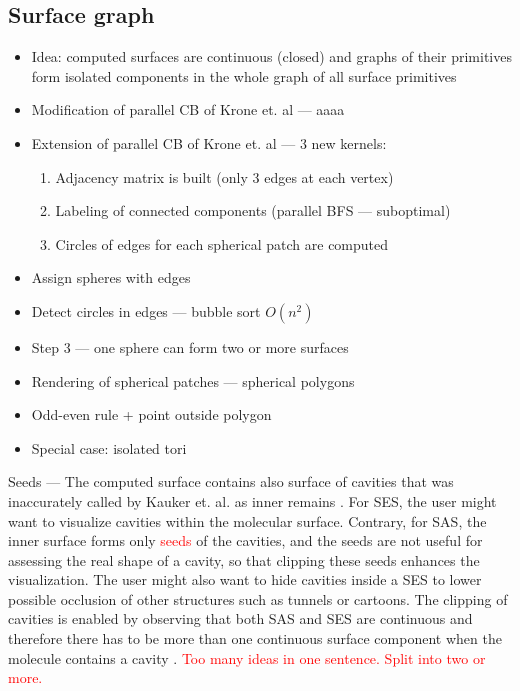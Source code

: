 \subsection{Surface graph}
\begin{itemize}
  \item Idea: computed surfaces are continuous (closed) and graphs of their primitives form isolated components in the whole graph of all surface primitives
  \item Modification of parallel CB of Krone et. al --- aaaa
  \item Extension of parallel CB of Krone et. al --- 3 new kernels:
	\begin{enumerate}
	  \item Adjacency matrix is built (only 3 edges at each vertex)
    \item Labeling of connected components (parallel BFS --- suboptimal)
    \item Circles of edges for each spherical patch are computed
  \end{enumerate}
  \item Assign spheres with edges
  \item Detect circles in edges --- bubble sort $O(n^2)$
  \item Step 3 --- one sphere can form two or more surfaces
  \item Rendering of spherical patches --- spherical polygons
  \item Odd-even rule + point outside polygon
  \item Special case: isolated tori
\end{itemize}

Seeds --- The computed surface contains also surface of cavities that was inaccurately called by Kauker et. al. as inner remains \cite{kauker2013rendering}.
For SES, the user might want to visualize cavities within the molecular surface.
Contrary, for SAS, the inner surface forms only \textcolor{red}{seeds} of the cavities, and the seeds are not useful for assessing the real shape of a cavity, so that clipping these seeds enhances the visualization.
The user might also want to hide cavities inside a SES to lower possible occlusion of other structures such as tunnels or cartoons.
The clipping of cavities is enabled by observing that both SAS and SES are continuous and therefore there has to be more than one continuous surface component when the molecule contains a cavity \cite{borland2011ambient}.
\textcolor{red}{Too many ideas in one sentence. Split into two or more.}


